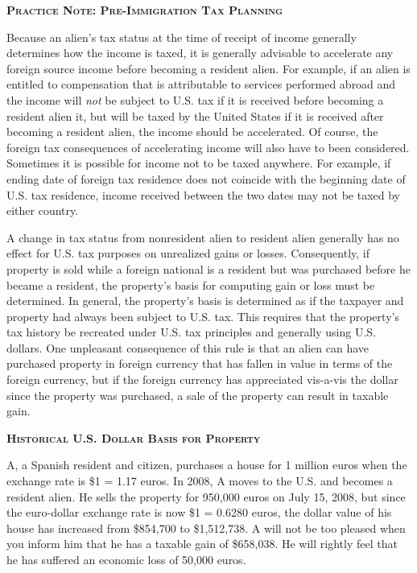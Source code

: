 \begin{enumerate}
\begin{framed}
	\begin{center}
		\textsc{\textbf{Practice Note:  Pre-Immigration Tax Planning}} 
	\end{center}
Because an alien's tax status at the time of receipt of income generally determines how the income is taxed, it is generally advisable to accelerate any foreign source income before becoming a resident alien.  For example, if an alien is entitled to compensation that is attributable to services performed abroad and the income will \textit{not} be subject to U.S. tax if it is received before becoming a resident alien it, but will be taxed by the United States if it is received after becoming a resident alien, the income should be accelerated.  Of course, the foreign tax consequences of accelerating income will also have to been considered.  Sometimes it is possible for income not to be taxed anywhere.  For example, if ending date of foreign tax residence does not coincide with the beginning date of U.S. tax residence, income received between the two dates may not be taxed by either country.    
\end{framed}

A change in tax status from nonresident alien to resident alien generally has no effect for U.S. tax purposes on unrealized gains or losses.  Consequently, if property is sold while a foreign national is a resident but was purchased before he became a resident, the property's basis for computing gain or loss must be determined.  In general, the property's basis is determined as if the taxpayer and property had always been subject to U.S. tax.     This requires that the property's tax history be recreated under U.S. tax principles and generally using U.S. dollars.  One unpleasant consequence of this rule is that an alien can have purchased property in foreign currency that has fallen in value in terms of the foreign currency, but if the foreign currency has appreciated vis-a-vis the dollar since the property was purchased, a sale of the property can result in taxable gain.  

	\begin{framed}
		\begin{center}
			\textbf{\textsc{Historical U.S. Dollar Basis for Property}}
		\end{center}
A, a Spanish resident and citizen, purchases a house for 1 million euros when the exchange rate is \$1 = 1.17 euros.   In 2008, A moves to the U.S. and becomes a resident alien.  He sells the property for 950,000 euros on July 15, 2008, but since the euro-dollar exchange rate is now \$1 = 0.6280 euros, the dollar value of his house has increased from \$854,700 to \$1,512,738.  A will not be too pleased when you inform him that he has a taxable gain of \$658,038.  He will rightly feel that he has suffered an economic loss of 50,000 euros.
	\end{framed}
	

\end{enumerate}
